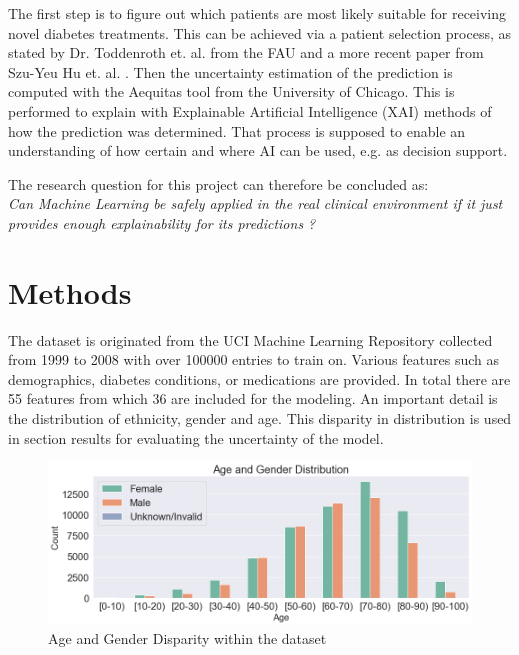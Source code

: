 \documentclass[journal]{IEEEtran}
\begin{document}
The first step is to figure out which patients are most likely suitable for receiving novel diabetes treatments. This can be achieved via a patient selection process, as stated by Dr. Toddenroth et. al. from the FAU \cite{cite4} and a more recent paper from Szu-Yeu Hu et. al. \cite{cite3}. Then the uncertainty estimation of the prediction is computed with the Aequitas tool from the University of Chicago. This is performed to explain with Explainable Artificial Intelligence (XAI) methods of how the prediction was determined. That process is supposed to enable an understanding of how certain and where AI can be used, e.g. as decision support. 

The research question for this project can therefore be concluded as: \\

\textit{Can Machine Learning be safely applied in the real clinical environment if it just provides enough explainability for its predictions ?} 

\section{Methods}
\noindent The dataset is originated from the UCI Machine Learning Repository \cite{uci} collected from 1999 to 2008 with over 100000 entries to train on. Various features such as demographics, diabetes conditions, or medications are provided. In total there are 55 features from which 36 are included for the modeling. An important detail is the distribution of ethnicity, gender and age. This disparity in distribution is used in section results for evaluating the uncertainty of the model.


\begin{figure}
	\centering
		\includegraphics[width=1\linewidth]{../imgs/age_new}
	\caption{Age and Gender Disparity within the dataset}
	\label{fig:age}
\end{figure}
\end{document}
